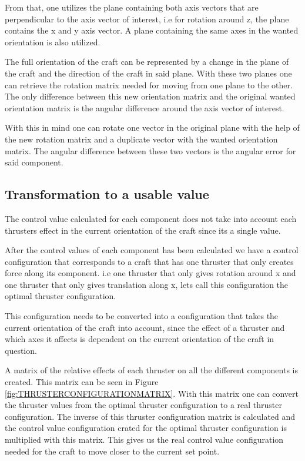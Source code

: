 From that, one utilizes the plane containing both axis vectors that are perpendicular to the axis vector of interest, i.e for rotation around z, the plane contains the x and y axis vector. A plane containing the same axes in the wanted orientation is also utilized.

The full orientation of the craft can be represented by a change in the plane of the craft and the direction of the craft in said plane. With these two planes one can retrieve the rotation matrix needed for moving from one plane to the other. The only difference between this new orientation matrix and the original wanted orientation matrix is the angular difference around the axis vector of interest.

With this in mind one can rotate one vector in the original plane with the help of the new rotation matrix and a duplicate vector with the wanted orientation matrix. The angular difference between these two vectors is the angular error for said component.

\subsection{Transformation to a usable value}
The control value calculated for each component does not take into account each thrusters effect in the current orientation of the craft since its a single value.

After the control values of each component has been calculated we have a control configuration that corresponds to a craft that has one thruster that only creates force along its component. i.e one thruster that only gives rotation around x and one thruster that only gives translation along x, lets call this configuration  the optimal thruster configuration. 

This configuration needs to be converted into a configuration that takes the current orientation of the craft into account, since the effect of a thruster and which axes it affects is dependent on the current orientation of the craft in question. 

A matrix of the relative effects of each thruster on all the different components is created. This matrix can be seen in Figure \ref{fig:THRUSTERCONFIGURATIONMATRIX}. With this matrix one can convert the thruster values from the optimal thruster configuration to a real thruster configuration. The inverse of this thruster configuration matrix is calculated and the control value configuration crated for the optimal thruster configuration is multiplied  with this matrix. This gives us the real control value configuration needed for the craft to move closer to the current set point.

